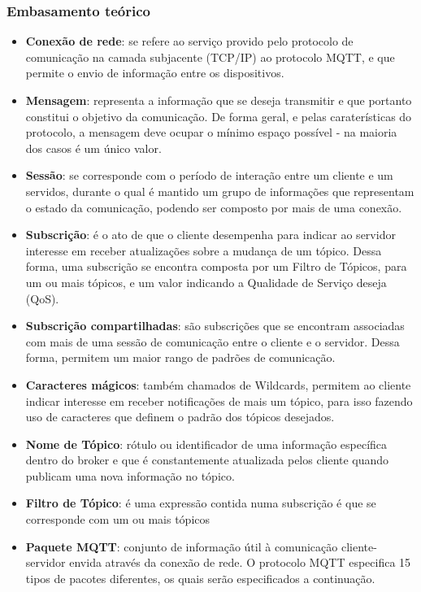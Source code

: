 \documentclass[12pt]{beamer}
\begin{document}
\begin{frame}[allowframebreaks]
    \frametitle{Embasamento teórico}
    \begin{itemize}
    		\item \textbf{Conexão de rede}: se refere ao serviço provido pelo protocolo de comunicação na camada subjacente (TCP/IP) ao protocolo MQTT, e que permite o envio de informação entre os dispositivos.
    		\item \textbf{Mensagem}: representa a informação que se deseja transmitir e que portanto constitui o objetivo da comunicação. De forma geral, e pelas caraterísticas do protocolo, a mensagem deve ocupar o mínimo espaço possível - na maioria dos casos é um único valor.
    		\item \textbf{Sessão}: se corresponde com o período de interação entre um cliente e um servidos, durante o qual é mantido um grupo de informações que representam o estado da comunicação, podendo ser composto por mais de uma conexão.
    		\item \textbf{Subscrição}: é o ato de que o cliente desempenha para indicar ao servidor interesse em receber atualizações sobre a mudança de um tópico. Dessa forma, uma subscrição se encontra composta por um Filtro de Tópicos, para um ou mais tópicos, e um valor indicando a Qualidade de Serviço deseja (QoS).
    		\item \textbf{Subscrição compartilhadas}: são subscrições que se encontram associadas com mais de uma sessão de comunicação entre o cliente e o servidor. Dessa forma, permitem um maior rango de padrões de comunicação.
    		\item \textbf{Caracteres mágicos}: também chamados de Wildcards, permitem ao cliente indicar interesse em receber notificações de mais um tópico, para isso fazendo uso de caracteres que definem o padrão dos tópicos desejados.
    		\item \textbf{Nome de Tópico}: rótulo ou identificador de uma informação específica dentro do broker e que é constantemente atualizada pelos cliente quando publicam uma nova informação no tópico.
    		\item \textbf{Filtro de Tópico}: é uma expressão contida numa subscrição é que se corresponde com um ou mais tópicos
    		\item \textbf{Paquete MQTT}: conjunto de informação útil à comunicação cliente-servidor envida através da conexão de rede. O protocolo MQTT especifica 15 tipos de pacotes diferentes, os quais serão especificados a continuação.
    \end{itemize}
    
\end{frame}
\end{document}
